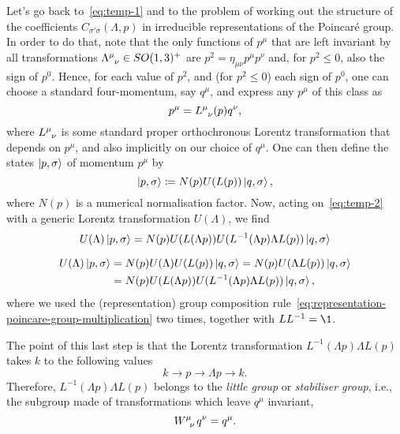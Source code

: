 Let's go back to~\eqref{eq:temp-1} and to the problem of working out the structure of the coefficients $C_{\sigma'\sigma}(\Lambda,p)$ in irreducible representations of the Poincaré group. In order to do that, note that the only functions of $p^\mu$ that are left invariant by all transformations $\tensor{\Lambda}{^\mu_\nu} \in SO(1,3)^+$ are $p^2 = \eta_{\mu\nu} p^\mu p^\nu$ and, for $p^2 \leq 0$, also the sign of $p^0$. Hence, for each value of $p^2$, and (for $p^2 \leq 0$) each sign of $p^0$, one can choose a standard four-momentum, say $q^\mu$, and express any $p^\mu$ of this class as
\begin{equation}
    p^\mu = \tensor{L}{^\mu_\nu}(p)q^\nu,
\end{equation}
where $\tensor{L}{^\mu_\nu}$ is some standard proper orthochronous Lorentz transformation that depends on $p^\mu$, and also implicitly on our choice of $q^\mu$. One can then define the states $\ket{p,\sigma}$ of momentum $p^\mu$ by
\begin{equation}\label{eq:temp-2}
    \ket{p,\sigma} \coloneq N(p) U(L(p)) \ket{q,\sigma},
\end{equation}
where $N(p)$ is a numerical normalisation factor. Now, acting on~\eqref{eq:temp-2} with a generic Lorentz transformation $U(\Lambda)$, we find
\begin{equation}\label{eq:temp-3}
    U(\Lambda) \ket{p,\sigma} = N(p) U(L(\Lambda p)) U(L^{-1}(\Lambda p) \Lambda L(p)) \ket{q,\sigma}
\end{equation}
\begin{mdframed}
\begin{innerproof}
    \begin{equation*}
    \begin{split}
        U(\Lambda) \ket{p,\sigma} &= N(p) U(\Lambda) U(L(p)) \ket{q,\sigma} = N(p) U(\Lambda L(p)) \ket{q,\sigma}\\
         &= N(p) U(L(\Lambda p)) U(L^{-1}(\Lambda p) \Lambda L(p)) \ket{q,\sigma} ,
    \end{split}
    \end{equation*}
    where we used the (representation) group composition rule~\eqref{eq:representation-poincare-group-multiplication} two times, together with $L L^{-1} = \1$.
\end{innerproof}
\end{mdframed}

 The point of this last step is that the Lorentz transformation $L^{-1}(\Lambda p) \Lambda L(p)$ takes $k$ to the following values
\begin{equation}
    k \to p \to \Lambda p \to k .
\end{equation}
Therefore, $L^{-1}(\Lambda p) \Lambda L(p)$ belongs to the \emph{little  group} or \emph{stabiliser group}, i.e., the subgroup made of transformations which leave $q^\mu$ invariant,
\begin{equation}\label{eq:little-group}
    \tensor{W}{^\mu_\nu} q^\nu = q^\mu .
\end{equation}

